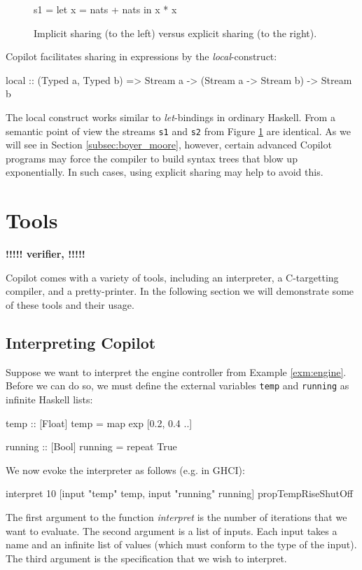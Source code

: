 \documentclass[]{article}
\newcommand{\todo}[1]{{\bf \Huge !!!!! #1 !!!!!}}
\theoremstyle{example}
\begin{document}
\begin{figure}[ht]
\begin{minipage}{0.5\textwidth}
\begin{code}
s1 = let x = nats + nats
     in x * x
\end{code}
\end{minipage}
\begin{minipage}{0.5\textwidth}
\end{minipage}
\caption{Implicit sharing (to the left) versus explicit sharing (to the right).}
\label{fig:explicit_sharing}
\end{figure}
\noindent Copilot facilitates sharing in expressions by the \emph{local}-construct:
%
\begin{code}
local
  :: (Typed a, Typed b)
  => Stream a
  -> (Stream a -> Stream b)
  -> Stream b
\end{code}
%
The local construct works similar to \emph{let}-bindings in ordinary Haskell.
From a semantic point of view the streams {\tt s1} and {\tt s2} from Figure
\ref{fig:explicit_sharing} are identical.
As we will see in Section \ref{subsec:boyer_moore}, however, certain advanced
Copilot programs may force the compiler to build syntax trees that blow up exponentially.
In such cases, using explicit sharing may help to avoid this.

\section{Tools}

\todo{verifier,}

Copilot comes with a variety of tools, including an interpreter,
a C-targetting compiler, and a pretty-printer. In the following section we will
demonstrate some of these tools and their usage.

\subsection{Interpreting Copilot}

Suppose we want to interpret the engine controller from Example \ref{exm:engine}.
Before we can do so, we must define the external variables {\tt temp}
and {\tt running} as infinite Haskell lists:
%
\begin{code}
temp :: [Float]
temp = map exp [0.2, 0.4 ..]

running :: [Bool]
running = repeat True
\end{code}
%
We now evoke the interpreter as follows (e.g. in GHCI):
%
\begin{code}
interpret
  10
  [input "temp" temp, input "running" running]
  propTempRiseShutOff
\end{code}
%
The first argument to the function \emph{interpret} is the number of iterations that we want to evaluate.
The second argument is a list of inputs. Each input takes a name and an infinite list of
values (which must conform to the type of the input). The third argument is the specification
that we wish to interpret.
\end{document}
